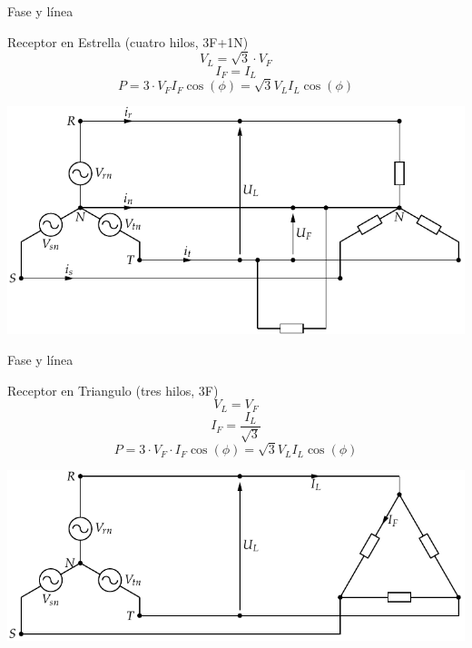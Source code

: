 \documentclass[xcolor={usenames,svgnames,dvipsnames}]{beamer}
\begin{document}
\begin{frame}[label={sec:orgbcce042}]{Fase y línea}
\begin{block}{Receptor en Estrella (cuatro hilos, 3F+1N)}
$$V_{L}=\sqrt{3}\cdot V_{F}$$ $$I_{F}=I_{L}$$
$$P=3\cdot V_{F}I_{F}\cos(\phi)=\sqrt{3}V_{L}I_{L}\cos(\phi)$$
\begin{center}
\includegraphics[width=.9\linewidth]{../figs/RedTrifasicaEstrella_CargaMonofasica.pdf}
\end{center}
\end{block}
\end{frame}

\begin{frame}[label={sec:org29ca6c5}]{Fase y línea}
\begin{block}{Receptor en Triangulo (tres hilos, 3F)}
$$V_{L}=V_{F}$$ $$I_{F}=\frac{I_{L}}{\sqrt{3}}$$
$$P=3\cdot V_{F}\cdot I_{F}\cos(\phi)=\sqrt{3}V_{L}I_{L}\cos(\phi)$$
\begin{center}
\includegraphics[width=.9\linewidth]{../figs/RedTrifasicaEstrella_CargaTriangulo.pdf}
\end{center}
\end{block}
\end{frame}
\end{document}
